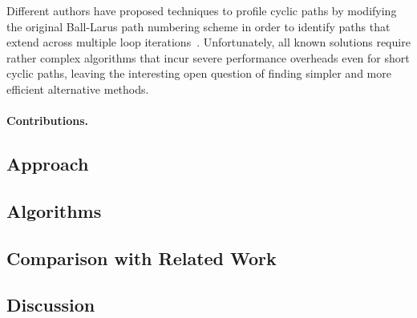 Different authors have proposed techniques to profile cyclic paths by modifying the original Ball-Larus path numbering scheme in order to identify paths that extend across multiple loop iterations~\cite{Tallam04,Roy09,Li12}. Unfortunately, all known solutions require rather complex algorithms that incur severe performance overheads even for short cyclic paths, leaving the interesting open question of finding simpler and more efficient alternative methods.

\paragraph*{Contributions.}

\subsection{Approach}

\subsection{Algorithms}


\subsection{Comparison with Related Work}

\subsection{Discussion}